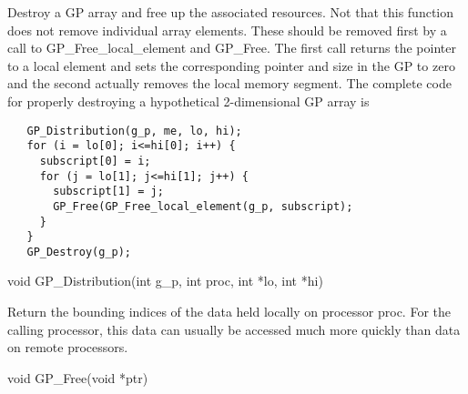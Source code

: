 \documentclass[12pt]{article}
\begin{document}
\wcoll

\begin{desc}

Destroy a GP array and free up the associated resources. Not that this function
does not remove individual array elements. These should be removed first by a
call to GP\_Free\_local\_element and GP\_Free. The first call returns the pointer to
a local element and sets the corresponding pointer and size in the GP to zero
and the second actually removes the local memory segment. The complete code for
properly destroying a hypothetical 2-dimensional GP array is

\begin{verbatim}
   GP_Distribution(g_p, me, lo, hi);
   for (i = lo[0]; i<=hi[0]; i++) {
     subscript[0] = i;
     for (j = lo[1]; j<=hi[1]; j++) {
       subscript[1] = j;
       GP_Free(GP_Free_local_element(g_p, subscript);
     }
   }
   GP_Destroy(g_p);
\end{verbatim}

\end{desc}



\begin{capi}
\begin{ccode}
void GP_Distribution(int g_p, int proc, int *lo, int *hi)
\end{ccode}
\begin{funcargs}
\end{funcargs}
\end{capi}

\local

\begin{desc}

Return the bounding indices of the data held locally on processor proc. For the
calling processor, this data can usually be accessed much more quickly than data
on remote processors.

\end{desc}


\begin{capi}
\begin{ccode}
void GP_Free(void *ptr)
\end{ccode}
\begin{funcargs}
\end{funcargs}
\end{capi}
\end{document}
